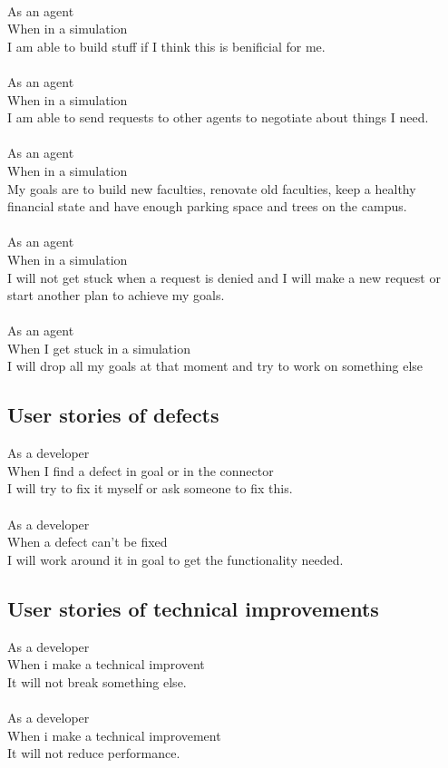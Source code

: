 \\
As an agent\\
When in a simulation\\
I am able to build stuff if I think this is benificial for me.\\
\\
As an agent\\
When in a simulation\\
I am able to send requests to other agents to negotiate about things I need.\\
\\
As an agent\\
When in a simulation\\
My goals are to build new faculties, renovate old faculties, keep a healthy financial state and have enough parking space and trees on the campus.\\
\\
As an agent\\
When in a simulation\\
I will not get stuck when a request is denied and I will make a new request or start another plan to achieve my goals.\\
\\
As an agent\\
When I get stuck in a simulation\\
I will drop all my goals at that moment and try to work on something else

\subsection{User stories of defects}
As a developer\\
When I find a defect in goal or in the connector\\
I will try to fix it myself or ask someone to fix this.\\
\\
As a developer\\
When a defect can't be fixed\\
I will work around it in goal to get the functionality needed.

\subsection{User stories of technical improvements}
As a developer\\
When i make a technical improvent\\
It will not break something else.\\
\\
As a developer\\
When i make a technical improvement\\
It will not reduce performance.

